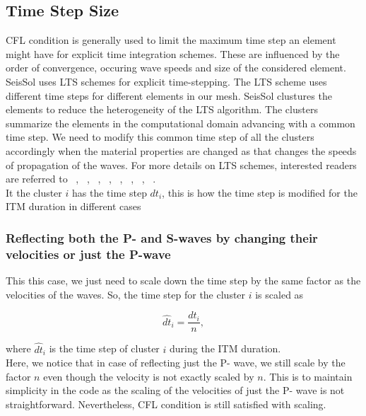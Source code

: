 \subsection{Time Step Size}\label{sec:time_step_size}
\ac{CFL} condition is generally used to limit the maximum time step an element might have for explicit time integration schemes. These are influenced by the order
of convergence, occuring wave speeds and size of the considered element. \\

SeisSol uses \ac{LTS} schemes for explicit time-stepping. The \ac{LTS} scheme uses different time steps for different elements in our mesh. 
SeisSol clustures the elements to reduce the heterogeneity of the \ac{LTS} algorithm. The clusters summarize the elements in the computational domain advancing
with a common time step. We need to modify this common time step of all the clusters accordingly when the material properties are changed as that changes the 
speeds of propagation of the waves. For more details on \ac{LTS} schemes, interested readers are referred to ~\parencite{breuer}, ~\parencite{dumbser2007arbitrary},
~\parencite{castro2009space}, ~\parencite{rietmann2015loadbalanced}, ~\parencite{seny2014efficient}, ~\parencite{Gassner2008}, ~\parencite{andrew}, 
~\parencite{SCHLEGEL2009345}. \\

It the cluster $i$ has the time step $dt_i$, this is how the time step is modified for the \ac{ITM} duration in different cases

\subsubsection{Reflecting both the P- and S-waves by changing their velocities or just the P-wave}
This this case, we just need to scale down the time step by the same factor as the velocities of the waves. So, the time step for the cluster $i$ is scaled as

\begin{equation}
    \hat{dt}_i = \frac{dt_i}{n} ,
\end{equation}

where $\hat{dt}_i$ is the time step of cluster $i$ during the \ac{ITM} duration. \\

Here, we notice that in case of reflecting just the P- wave, we still scale by the factor $n$ even though the velocity is not exactly scaled by $n$. This is
to maintain simplicity in the code as the scaling of the velocities of just the P- wave is not straightforward. Nevertheless, \ac{CFL} condition is still 
satisfied with scaling. \\

